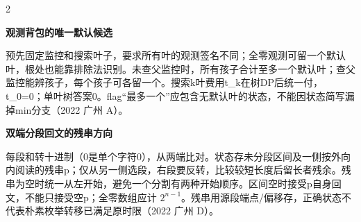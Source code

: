 \documentclass[UTF8,fontset=fandol,a4paper,twoside]{ctexart}
\newcommand{\note}[1]{{\fontsize{10}{12}\selectfont #1\par}}
\begin{document}
\begin{multicols}{2}
\par\textbf{观测背包的唯一默认候选}\quad
\note{预先固定监控和搜索叶子，要求所有叶的观测签名不同；全零观测可留一个默认叶，根处也能靠排除法识别。未查父监控时，所有孩子合计至多一个默认叶；查父监控能辨孩子，每个孩子可各留一个。搜索k叶费用t\_k在树DP后统一付，t\_0=\allowbreak{}0；单叶树答案0。flag“最多一个”应包含无默认叶的状态，不能因状态简写漏掉min分支（2022 广州 A）。}
\par\textbf{双端分段回文的残串方向}\quad
\note{每段和转十进制（0是单个字符0），从两端比对。状态存未分段区间及一侧按外向内阅读的残串p；仅从另一侧选段，右段要反转，比较较短长度后留长者残余。残串为空时统一从左开始，避免一个分割有两种开始顺序。区间空时接受p自身回文，不能只接受空p；全零数组应计 $2^{n-1}$。残串用源段端点/\allowbreak{}偏移存，正确状态不代表朴素枚举转移已满足原时限（2022 广州 D）。}
\end{multicols}
\end{document}
